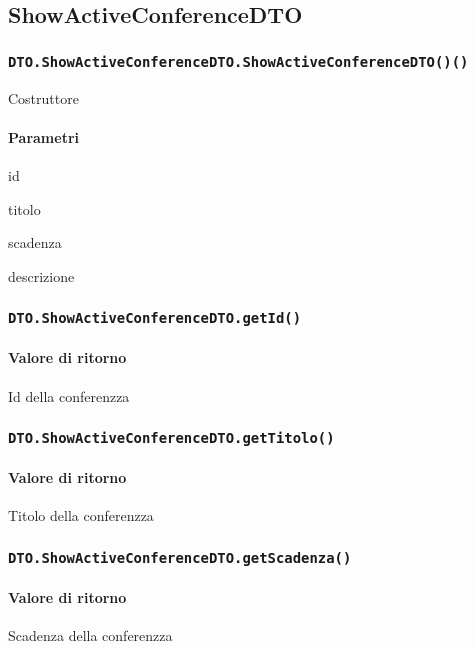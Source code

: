 \subsection{ShowActiveConferenceDTO}
\subsubsection{\texttt{DTO.ShowActiveConferenceDTO.ShowActiveConferenceDTO()()}}
Costruttore
\paragraph{Parametri}
\begin{description}
\item id
\item titolo
\item scadenza
\item descrizione
\end{description}
\subsubsection{\texttt{DTO.ShowActiveConferenceDTO.getId()}}
\paragraph{Valore di ritorno}
\begin{description}
\item Id della conferenzza
\end{description}
\subsubsection{\texttt{DTO.ShowActiveConferenceDTO.getTitolo()}}
\paragraph{Valore di ritorno}
\begin{description}
\item Titolo della conferenzza
\end{description}
\subsubsection{\texttt{DTO.ShowActiveConferenceDTO.getScadenza()}}
\paragraph{Valore di ritorno}
\begin{description}
\item Scadenza  della conferenzza
\end{description}
